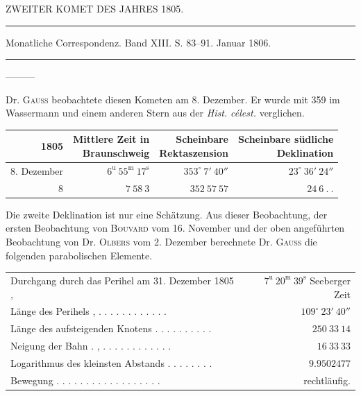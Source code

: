 \begin{center}
ZWEITER KOMET DES JAHRES 1805.

\rule{0.6\linewidth}{0.4pt}

Monatliche Correspondenz. Band XIII. S. 83–91. Januar 1806.

\rule{0.6\linewidth}{0.4pt}

—\quad—\quad—
\end{center}

Dr. \textsc{Gauss} beobachtete diesen Kometen am 8. Dezember. Er wurde mit 359 im Wassermann und einem anderen Stern aus der \emph{Hist. célest.} verglichen.

\begin{center}
\begingroup\fontsize{9}{11}\selectfont\setlength{\tabcolsep}{3pt}\renewcommand{\arraystretch}{1.1}
\begin{tabular}{r|r|r|r}
1805 & \shortstack{Mittlere Zeit in\\Braunschweig} & \shortstack{Scheinbare\\Rektaszension} & \shortstack{Scheinbare südliche\\Deklination}\\ \hline
8. Dezember & $6^{\mathrm u}\ 55^{\mathrm m}\ 17^{\mathrm s}$ & $353^\circ\ 7'\ 40''$ & $23^\circ\ 36'\ 24''$ \\
8 & $7\ 58\ 3$ & $352\ 57\ 57$ & $24\ 6\ .\ .$ \\
\end{tabular}\endgroup
\end{center}

\par\indent Die zweite Deklination ist nur eine Schätzung. Aus dieser Beobachtung, der ersten Beobachtung von \textsc{Bouvard} vom 16. November und der oben angeführten Beobachtung von Dr. \textsc{Olbers} vom 2. Dezember berechnete Dr. \textsc{Gauss} die folgenden parabolischen Elemente.

\begin{center}
\begingroup\fontsize{8}{10}\selectfont\setlength{\tabcolsep}{3pt}\renewcommand{\arraystretch}{1.1}
\begin{tabular}{lr}
Durchgang durch das Perihel am 31. Dezember 1805 , & $7^{\mathrm u}\ 20^{\mathrm m}\ 39^{\mathrm s}$ Seeberger Zeit \\
Länge des Perihels , . . . . . . . . . . . . & $109^\circ\ 23'\ 40''$ \\
Länge des aufsteigenden Knotens . . . . . . . . . . & $250\ 33\ 14$ \\
Neigung der Bahn . , . . . . . \raisebox{.3ex}{.} . . . . . . . & $16\ 33\ 33$ \\
Logarithmus des kleinsten Abstands . . . . . . . . & $9.9502477$ \\
Bewegung . . . . . . . . . . . . . . . . . . & rechtläufig. \\
\end{tabular}\endgroup
\end{center}

